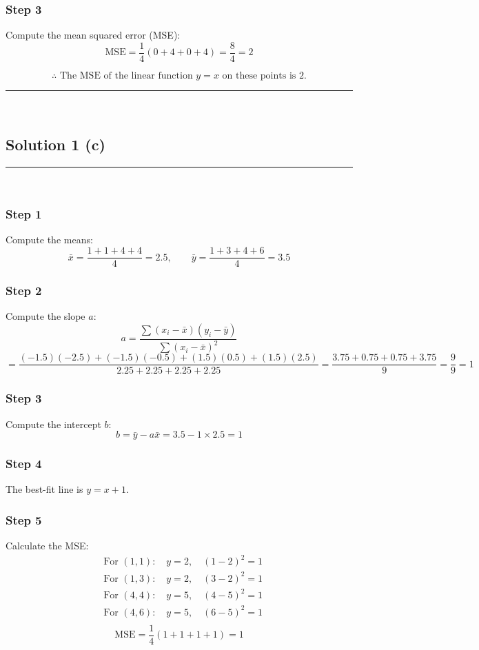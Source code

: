 \documentclass{article}
\begin{document}
\subsubsection*{Step 3}
\parbox{\textwidth}{
Compute the mean squared error (MSE):
\[
\text{MSE} = \frac{1}{4}(0 + 4 + 0 + 4) = \frac{8}{4} = 2
\]
}

\parbox{\textwidth}{
\[
\therefore \text{ The MSE of the linear function } y = x \text{ on these points is } 2.
\]
}

\noindent\rule{\textwidth}{0.4pt}\\

\newpage

\subsection*{Solution 1 (c)}
\noindent\rule{\textwidth}{0.4pt}\\

\subsubsection*{Step 1}
\parbox{\textwidth}{
Compute the means:
\[
\bar{x} = \frac{1 + 1 + 4 + 4}{4} = 2.5, \qquad
\bar{y} = \frac{1 + 3 + 4 + 6}{4} = 3.5
\]
}

\subsubsection*{Step 2}
\parbox{\textwidth}{
Compute the slope $a$:
\[
a = \frac{\sum (x_i - \bar{x})(y_i - \bar{y})}{\sum (x_i - \bar{x})^2}
\]
\[
= \frac{(-1.5)(-2.5) + (-1.5)(-0.5) + (1.5)(0.5) + (1.5)(2.5)}{2.25 + 2.25 + 2.25 + 2.25}
= \frac{3.75 + 0.75 + 0.75 + 3.75}{9}
= \frac{9}{9} = 1
\]
}

\subsubsection*{Step 3}
\parbox{\textwidth}{
Compute the intercept $b$:
\[
b = \bar{y} - a\bar{x} = 3.5 - 1 \times 2.5 = 1
\]
}

\subsubsection*{Step 4}
\parbox{\textwidth}{
The best-fit line is $y = x + 1$.
}

\subsubsection*{Step 5}
\parbox{\textwidth}{
Calculate the MSE:
\[
\begin{aligned}
&\text{For } (1,1):\quad y = 2,\quad (1-2)^2 = 1 \\
&\text{For } (1,3):\quad y = 2,\quad (3-2)^2 = 1 \\
&\text{For } (4,4):\quad y = 5,\quad (4-5)^2 = 1 \\
&\text{For } (4,6):\quad y = 5,\quad (6-5)^2 = 1 \\
\end{aligned}
\]
\[
\text{MSE} = \frac{1}{4}(1 + 1 + 1 + 1) = 1
\]
}
\end{document}
